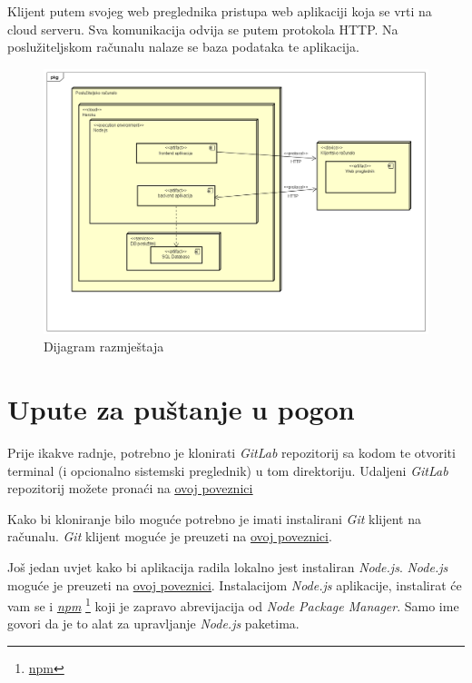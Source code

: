 			 Klijent putem svojeg web preglednika pristupa web aplikaciji koja se vrti na cloud serveru. Sva komunikacija odvija se putem protokola HTTP. Na poslužiteljskom računalu nalaze se baza podataka te aplikacija.
			 \begin{figure}[H]
    			\includegraphics[width=1\linewidth]{dijagrami/Deployment Diagram.png}
    			\caption{Dijagram razmještaja}
    			\label{fig:Dijagram razmještaja} 
    		\end{figure}
			\eject 
		
		\section{Upute za puštanje u pogon}
		
		    Prije ikakve radnje, potrebno je klonirati \textit{GitLab} repozitorij sa kodom te otvoriti terminal (i opcionalno sistemski preglednik) u tom direktoriju. Udaljeni \textit{GitLab} repozitorij možete pronaći na  \underline{\href{https://gitlab.com/Cubi5/seven}{ovoj poveznici}}
		    
		    Kako bi kloniranje bilo moguće potrebno je imati instalirani \textit{Git} klijent na računalu. \textit{Git} klijent moguće je preuzeti na \underline{\href{https://git-scm.com/downloads}{ovoj poveznici}}.
		    
		    Još jedan uvjet kako bi aplikacija radila lokalno jest instaliran \textit{Node.js}. \textit{Node.js} moguće je preuzeti na \underline{\href{https://nodejs.org/en/download/}{ovoj poveznici}}. Instalacijom \textit{Node.js} aplikacije, instalirat će vam se i \textit{\underline{npm}} \footnote{\href{https://www.npmjs.com/}{npm}} koji je zapravo abrevijacija od \textit{Node Package Manager}. Samo ime govori da je to alat za upravljanje \textit{Node.js} paketima.

